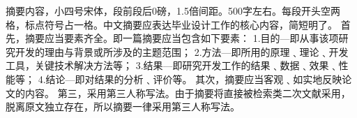 \begin{abstractc}
摘要内容，小四号宋体，段前段后0磅，1.5倍间距。500字左右。每段开头空两格，标点符号占一格。中文摘要应表达毕业设计工作的核心内容，简短明了。
首先，摘要应当要素齐全。即一篇摘要应当包含如下要素：
1.目的—即从事该项研究开发的理由与背景或所涉及的主题范围；
2.方法—即所用的原理﹑理论﹑开发工具，关键技术解决方法等；
3.结果—即研究开发工作的结果﹑数据﹑效果﹑性能等；
4.结论—即对结果的分析﹑评价等。
其次，摘要应当客观﹑如实地反映论文的内容。
第三，采用第三人称写法。由于摘要将直接被检索类二次文献采用，脱离原文独立存在，所以摘要一律采用第三人称写法。

\end{abstractc}
